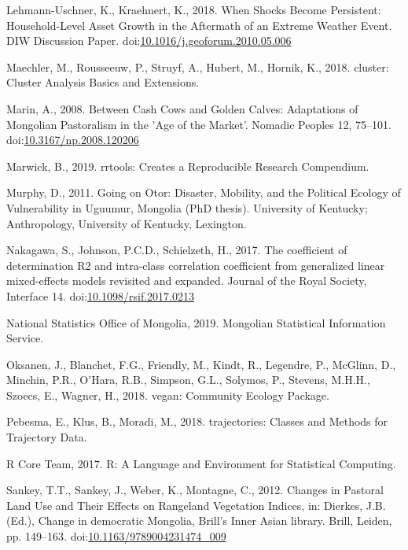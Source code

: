 \documentclass[]{elsarticle} %
\newlength{\cslhangindent}
\newenvironment{cslreferences}%
  {\setlength{\parindent}{0pt}%
  \everypar{\setlength{\hangindent}{\cslhangindent}}\ignorespaces}%
  {\par}
\begin{document}
\begin{cslreferences}
\leavevmode\hypertarget{ref-LehmannUschner.2018}{}%
Lehmann-Uschner, K., Kraehnert, K., 2018. When Shocks Become Persistent:
Household-Level Asset Growth in the Aftermath of an Extreme Weather
Event. DIW Discussion Paper.
doi:\href{https://doi.org/10.1016/j.geoforum.2010.05.006}{10.1016/j.geoforum.2010.05.006}

\leavevmode\hypertarget{ref-Maechler.2018}{}%
Maechler, M., Rousseeuw, P., Struyf, A., Hubert, M., Hornik, K., 2018.
cluster: Cluster Analysis Basics and Extensions.

\leavevmode\hypertarget{ref-Marin.2008}{}%
Marin, A., 2008. Between Cash Cows and Golden Calves: Adaptations of
Mongolian Pastoralism in the 'Age of the Market'. Nomadic Peoples 12,
75--101.
doi:\href{https://doi.org/10.3167/np.2008.120206}{10.3167/np.2008.120206}

\leavevmode\hypertarget{ref-Marwick.2019}{}%
Marwick, B., 2019. rrtools: Creates a Reproducible Research Compendium.

\leavevmode\hypertarget{ref-Murphy.2011}{}%
Murphy, D., 2011. Going on Otor: Disaster, Mobility, and the Political
Ecology of Vulnerability in Uguumur, Mongolia (PhD thesis). University
of Kentucky; Anthropology, University of Kentucky, Lexington.

\leavevmode\hypertarget{ref-Nakagawa.2017}{}%
Nakagawa, S., Johnson, P.C.D., Schielzeth, H., 2017. The coefficient of
determination R2 and intra-class correlation coefficient from
generalized linear mixed-effects models revisited and expanded. Journal
of the Royal Society, Interface 14.
doi:\href{https://doi.org/10.1098/rsif.2017.0213}{10.1098/rsif.2017.0213}

\leavevmode\hypertarget{ref-NationalStatisticsOfficeofMongolia.2019}{}%
National Statistics Office of Mongolia, 2019. Mongolian Statistical
Information Service.

\leavevmode\hypertarget{ref-Oksanen.2018}{}%
Oksanen, J., Blanchet, F.G., Friendly, M., Kindt, R., Legendre, P.,
McGlinn, D., Minchin, P.R., O'Hara, R.B., Simpson, G.L., Solymos, P.,
Stevens, M.H.H., Szoecs, E., Wagner, H., 2018. vegan: Community Ecology
Package.

\leavevmode\hypertarget{ref-Pebesma.2018}{}%
Pebesma, E., Klus, B., Moradi, M., 2018. trajectories: Classes and
Methods for Trajectory Data.

\leavevmode\hypertarget{ref-RCoreTeam.2017}{}%
R Core Team, 2017. R: A Language and Environment for Statistical
Computing.

\leavevmode\hypertarget{ref-Sankey.2012}{}%
Sankey, T.T., Sankey, J., Weber, K., Montagne, C., 2012. Changes in
Pastoral Land Use and Their Effects on Rangeland Vegetation Indices, in:
Dierkes, J.B. (Ed.), Change in democratic Mongolia, Brill's Inner Asian
library. Brill, Leiden, pp. 149--163.
doi:\href{https://doi.org/10.1163/9789004231474_009}{10.1163/9789004231474\_009}


\end{cslreferences}
\end{document}

